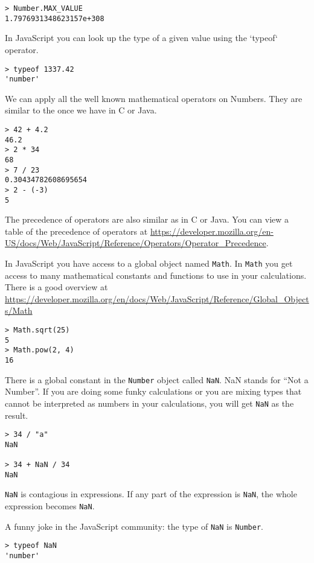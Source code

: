 \begin{lstlisting}
> Number.MAX_VALUE
1.7976931348623157e+308
\end{lstlisting}

In JavaScript you can look up the type of a given value using the `typeof` operator.

\begin{lstlisting}
> typeof 1337.42
'number'
\end{lstlisting}

We can apply all the well known mathematical operators on Numbers. They are similar to the once we have in C or Java.

\begin{lstlisting}
> 42 + 4.2
46.2
> 2 * 34
68
> 7 / 23
0.30434782608695654
> 2 - (-3)
5
\end{lstlisting}

The precedence of operators are also similar as in C or Java. You can view a table of the precedence of operators at \url{https://developer.mozilla.org/en-US/docs/Web/JavaScript/Reference/Operators/Operator_Precedence}.

In JavaScript you have access to a global object named \texttt{Math}. In \texttt{Math} you get access to many mathematical constants and functions to use in your calculations. There is a good overview at \url{https://developer.mozilla.org/en/docs/Web/JavaScript/Reference/Global_Objects/Math}

\begin{lstlisting}
> Math.sqrt(25)
5
> Math.pow(2, 4)
16
\end{lstlisting}

There is a global constant in the \texttt{Number} object called \texttt{NaN}. NaN stands for ``Not a Number''. If you are doing some funky calculations or you are mixing types that cannot be interpreted as numbers in your calculations, you will get \texttt{NaN} as the result.

\begin{lstlisting}
> 34 / "a"
NaN

> 34 + NaN / 34
NaN
\end{lstlisting}

\texttt{NaN} is contagious in expressions. If any part of the expression is \texttt{NaN}, the whole expression becomes \texttt{NaN}.

A funny joke in the JavaScript community: the type of \texttt{NaN} is \texttt{Number}.

\begin{lstlisting}
> typeof NaN
'number'
\end{lstlisting}

